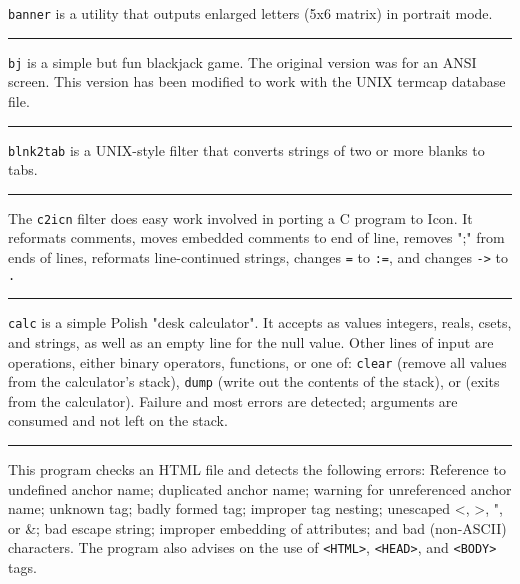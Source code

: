 {\texttt{banner} is a utility that outputs enlarged letters (5x6 matrix) in
portrait mode.

\vspace{0.25cm}\hrule{}

\texttt{bj} is a simple but fun blackjack game. The original version was
for an ANSI screen. This version has been modified to work with the
UNIX termcap database file.

\vspace{0.25cm}\hrule{}

\texttt{blnk2tab} is a UNIX-style filter that converts strings of two or
more blanks to tabs.

\vspace{0.25cm}\hrule{}

The \texttt{c2icn} filter does easy work involved in porting a C
program to Icon. It reformats comments, moves embedded
comments to end of line, removes ";"
from ends of lines, reformats line-continued strings, changes
\texttt{=} to \texttt{:=}, and changes \texttt{{}-{\textgreater}} to
\texttt{.} 

\vspace{0.25cm}\hrule{}

\texttt{calc} is a simple Polish "desk calculator". It accepts as values
integers, reals, csets, and strings, as well as
an empty line for the null value. Other lines of input are operations,
either binary operators, functions, or one of:
\texttt{clear} (remove all values from the
calculator's stack), \texttt{dump} (write out the contents of the stack), or  (exits from the calculator).
Failure and most errors are detected; arguments are consumed and not
left on the stack.

\vspace{0.25cm}\hrule{}

This program checks an HTML file and detects the following
errors: Reference to undefined anchor name; duplicated anchor name;
warning for unreferenced anchor name; unknown tag; badly formed tag;
improper tag nesting; unescaped {\textless}, {\textgreater}, ", or \&;
bad escape string; improper embedding of attributes; and
bad (non-ASCII) characters.
The program also advises on the use of
\texttt{{\textless}HTML{\textgreater}},
\texttt{{\textless}HEAD{\textgreater}}, and
\texttt{{\textless}BODY{\textgreater}} tags. 

}
